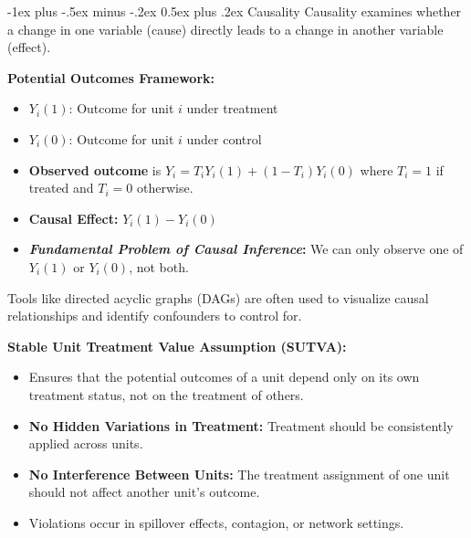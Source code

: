 \documentclass[10pt,landscape]{article}
\makeatletter
\renewcommand{\section}{\@startsection{section}{1}{0mm}%
                                {-1ex plus -.5ex minus -.2ex}%
                                {0.5ex plus .2ex}%
                                {\normalfont\large\bfseries}}
\makeatother
\begin{document}
\begin{multicols}{3}
\section{Causality}
Causality examines whether a change in one variable (cause) directly leads to a change in another variable (effect). 

\textbf{Potential Outcomes Framework:}
\begin{itemize}[label={--},leftmargin=2mm]
    \itemsep -.4mm
    \item $Y_i(1)$: Outcome for unit $i$ under treatment
    \item $Y_i(0)$: Outcome for unit $i$ under control
    \item \textbf{Observed outcome} is 
    $Y_i = T_i Y_i(1) + (1 - T_i) Y_i(0)$
    where $T_i = 1$ if treated and $T_i = 0$ otherwise.
    \item \textbf{Causal Effect:} $Y_i(1) - Y_i(0)$
    \item \textbf{\emph{Fundamental Problem of Causal Inference}:} We can only observe one of $Y_i(1)$ or $Y_i(0)$, not both.

\end{itemize}

Tools like directed acyclic graphs (DAGs) are often used to visualize causal relationships and identify confounders to control for.

\textbf{Stable Unit Treatment Value Assumption (SUTVA):}
\begin{itemize}[label={--},leftmargin=3mm]
    \setlength{\itemsep}{-0.8mm}
    \item Ensures that the potential outcomes of a unit depend only on its own treatment status, not on the treatment of others.
    \item \textbf{No Hidden Variations in Treatment:} Treatment should be consistently applied across units.
    \item \textbf{No Interference Between Units:} The treatment assignment of one unit should not affect another unit's outcome.
    \item Violations occur in spillover effects, contagion, or network settings.
\end{itemize}


\end{multicols}
\end{document}
